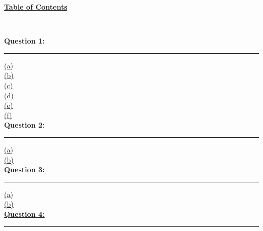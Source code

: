 \documentclass[12pt]{article}
\begin{document}
\begin{center}
    \hypertarget{toc}{\LARGE \underline{\textbf{Table of Contents}}}\\
\end{center}

{\textbf{Question 1:}}
\vspace{1mm}
\hrule
\vspace{1mm}
\hyperlink{1.1}{(a)}\\
\hyperlink{1.2}{(b)}\\
\hyperlink{1.3}{(c)}\\
\hyperlink{1.4}{(d)}\\
\hyperlink{1.5}{(e)}\\
\hyperlink{1.6}{(f)}\\

\textbf{Question 2:}
\vspace{1mm}
\hrule
\vspace{1mm}
\hyperlink{2.1}{(a)}\\
\hyperlink{2.2}{(b)}\\

\textbf{Question 3:}
\vspace{1mm}
\hrule
\vspace{1mm}
\hyperlink{3.1}{(a)}\\
\hyperlink{3.2}{(b)}\\

\hyperlink{4}{\textbf{Question 4:}}
\vspace{1mm}
\hrule
\vspace{1mm} \leavevmode \\

\newpage


\end{document}
